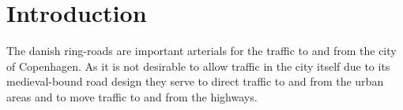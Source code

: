 \section{Introduction}

The danish ring-roads are important arterials for the traffic 	to and from the city of Copenhagen. As it is not desirable to allow traffic in the city itself due to its medieval-bound road design they serve to direct traffic to and from the urban areas and to move traffic to and from the highways.